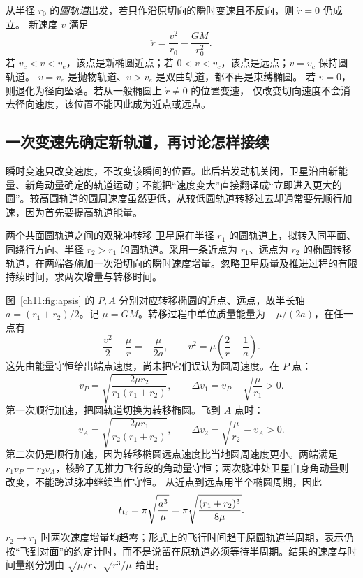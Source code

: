 从半径 $r_0$ 的\emph{圆轨道}出发，若只作沿原切向的瞬时变速且不反向，则 $\dot r=0$ 仍成立。
新速度 $v$ 满足
\[
 \ddot r=\frac{v^2}{r_0}-\frac{GM}{r_0^2}.
\]
若 $v_c<v<v_e$，该点是新椭圆近点；若 $0<v<v_c$，该点是远点；$v=v_c$ 保持圆轨道。
$v=v_e$ 是抛物轨道、$v>v_e$ 是双曲轨道，都不再是束缚椭圆。
若 $v=0$，则退化为径向坠落。若从一般椭圆上 $\dot r\ne0$ 的位置变速，
仅改变切向速度不会消去径向速度，该位置不能因此成为近点或远点。

\subsection{一次变速先确定新轨道，再讨论怎样接续}
瞬时变速只改变速度，不改变该瞬间的位置。此后若发动机关闭，卫星沿由新能量、新角动量确定的轨道运动；不能把“速度变大”直接翻译成“立即进入更大的圆”。较高圆轨道的圆周速度虽然更低，从较低圆轨道转移过去却通常要先顺行加速，因为首先要提高轨道能量。

\begin{origexamplebox}{两个共面圆轨道之间的双脉冲转移}\label{ch11:ex:teaching-transfer}
卫星原在半径 $r_1$ 的圆轨道上，拟转入同平面、同绕行方向、半径 $r_2>r_1$ 的圆轨道。采用一条近点为 $r_1$、远点为 $r_2$ 的椭圆转移轨道，在两端各施加一次沿切向的瞬时速度增量。忽略卫星质量及推进过程的有限持续时间，求两次增量与转移时间。

\ThQTransfer
\end{origexamplebox}
\begin{xesolution}
\ThATransfer

图~\ref{ch11:fig:apsis} 的 $P,A$ 分别对应转移椭圆的近点、远点，故半长轴 $a=(r_1+r_2)/2$。记 $\mu=GM$。转移过程中单位质量能量为 $-\mu/(2a)$，在任一点有
\[
 \frac{v^2}{2}-\frac\mu r=-\frac\mu{2a},
 \qquad v^2=\mu\left(\frac2r-\frac1a\right).
\]
这先由能量守恒给出端点速度，尚未把它们误认为圆周速度。在 $P$ 点：
\[
 v_P=\sqrt{\frac{2\mu r_2}{r_1(r_1+r_2)}},\qquad
 \Delta v_1=v_P-\sqrt{\frac\mu{r_1}}>0.
\]
第一次顺行加速，把圆轨道切换为转移椭圆。飞到 $A$ 点时：
\[
 v_A=\sqrt{\frac{2\mu r_1}{r_2(r_1+r_2)}},\qquad
 \Delta v_2=\sqrt{\frac\mu{r_2}}-v_A>0.
\]
第二次仍是顺行加速，因为转移椭圆远点速度比当地圆周速度更小。两端满足 $r_1v_P=r_2v_A$，核验了无推力飞行段的角动量守恒；两次脉冲处卫星自身角动量则改变，不能跨过脉冲继续当作守恒。
从近点到远点用半个椭圆周期，因此
\[
 t_{\rm tr}=\pi\sqrt{\frac{a^3}{\mu}}
 =\pi\sqrt{\frac{(r_1+r_2)^3}{8\mu}}.
\]
$r_2\to r_1$ 时两次速度增量均趋零；形式上的飞行时间趋于原圆轨道半周期，表示仍按“飞到对面”的约定计时，而不是说留在原轨道必须等待半周期。结果的速度与时间量纲分别由 $\sqrt{\mu/r}$、$\sqrt{r^3/\mu}$ 给出。
\end{xesolution}

